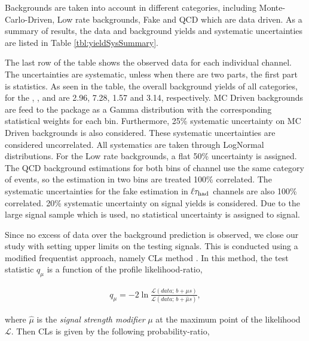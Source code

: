Backgrounds are taken into account in different categories, including Monte-Carlo-Driven, Low rate backgrounds, Fake and QCD which are data driven.
As a summary of results, the data and background yields and systematic uncertainties are listed in Table \ref{tbl:yieldSysSummary}. 

The last row of the table shows the observed data for  each individual channel.  The uncertainties are systematic, unless when there are 
two parts, the first part is statistics.
As seen in the table, the overall background yields of all categories, 
for the \eTau, \muTau, \tauTau \binone and \bintwo are  
2.96, 7.28, 1.57 and 3.14, respectively.
MC Driven backgrounds are feed to the package as a Gamma distribution with the corresponding statistical weights for each bin.
Furthermore, 25\% systematic uncertainty on MC Driven backgrounds is also considered. These systematic uncertainties are considered uncorrelated.
All systematics are taken through LogNormal distributions. For the Low rate backgrounds, a flat 50\% uncertainty is assigned.
The QCD background estimations for 
both bins of \tauTau channel use the same category of events, so the estimation in two bins are treated 100\% correlated. 
The systematic uncertainties for the fake estimation in $\ell\tau_{\rm had}$ channels are also 100\% correlated. 
20\% systematic uncertainty on signal yields is considered. 
Due to the large signal sample which is used, no statistical uncertainty is assigned to signal.

Since no excess of data over the background prediction is observed, 
we close our study with setting upper limits on the testing signals.
This is conducted using a modified frequentist approach, namely CLs method \cite{read:CLs}.
In this method, the test statistic $q_\mu$ 
is a function of the profile likelihood-ratio,

\begin{align}
q_\mu = -2 \ln \frac{\mathcal{L}(data ;\, b + \mu s)}{\mathcal{L}(data ;\, b + \hat{\mu} s)},
\end{align}

where $\hat\mu$ is the \textit{signal strength modifier} $\mu$ at the maximum point of the likelihood $\mathcal{L}$.
Then CLs is given by the following probability-ratio,

